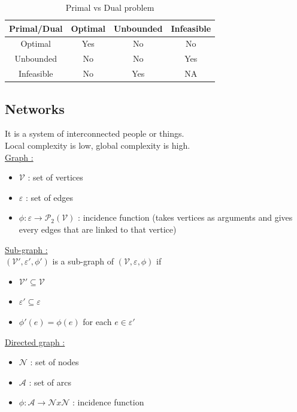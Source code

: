 \documentclass[../main.tex]{subfiles}
\begin{document}
\begin{table}[hbt!]
    \centering
    \begin{tabular}{c|c|c|c}
       Primal/Dual  & Optimal & Unbounded & Infeasible \\ \hline
       Optimal  & Yes & No & No\\
       Unbounded & No & No & Yes\\
       Infeasible & No & Yes & NA\\
    \end{tabular}
    \caption{Primal vs Dual problem}
\end{table}

\subsection{Networks}
It is a system of interconnected people or things.\\
Local complexity is low, global complexity is high.\\

\quad \underline{Graph :} \begin{itemize}
    \item $\mathcal{V}$ : set of vertices\\
    \item $\varepsilon$ : set of edges\\
    \item $\phi : \varepsilon \rightarrow \mathcal{P}_2(\mathcal{V})$ : incidence function (takes vertices as arguments and gives every edges that are linked to that vertice)\\
\end{itemize}

\quad \underline{Sub-graph :}\\
$(\mathcal{V}', \varepsilon', \phi')$ is a sub-graph of $(\mathcal{V}, \varepsilon, \phi)$ if \begin{itemize}
    \item $\mathcal{V}' \subseteq \mathcal{V}$\\
    \item $\varepsilon' \subseteq \varepsilon$\\
    \item $\phi'(e) = \phi(e)$ for each $e\in \varepsilon'$\\
\end{itemize}

\quad \underline{Directed graph :}\\
\begin{itemize}
    \item $\mathcal{N}$ : set of nodes\\
    \item $\mathcal{A}$ : set of arcs\\
    \item $\phi : \mathcal{A} \rightarrow \mathcal{N}x \mathcal{N}$ : incidence function\\
\end{itemize}
\end{document}
